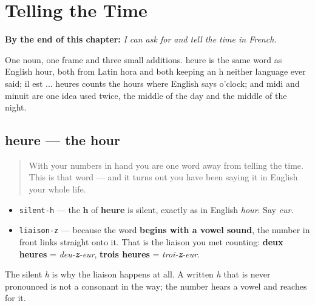 
\chapter{Telling the Time}
\label{ch:time}

\begin{chapteropening}
\textbf{By the end of this chapter:} \emph{I can ask for and tell the time in French.}

One noun, one frame and three small additions. heure is the same word as English hour, both from Latin hora and both keeping an h neither language ever said; il est ... heures counts the hours where English says o'clock; and midi and minuit are one idea used twice, the middle of the day and the middle of the night.
\end{chapteropening}

\section[heure]{heure — the hour}

\label{lesson:FR-C08-heure}



\begin{quote}
With your numbers in hand you are one word away from telling the time. This is that word — and it turns out you have been saying it in English your whole life.
\end{quote}

\begin{sounds}
\begin{itemize}
\raggedright
  \item \texttt{silent-h} — the \textbf{h} of \textbf{heure} is silent, exactly as in English \emph{hour}. Say \emph{eur}.
  \item \texttt{liaison-z} — because the word \textbf{begins with a vowel sound}, the number in front links straight onto it. That is the liaison you met counting: \textbf{deux heures} = \emph{deu-\textbf{z}-eur}, \textbf{trois heures} = \emph{troi-\textbf{z}-eur}.
\end{itemize}

The silent \emph{h} is why the liaison happens at all. A written \emph{h} that is never pronounced is not a consonant in the way; the number hears a vowel and reaches for it.
\end{sounds}

